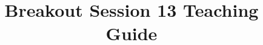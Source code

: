 \documentclass[nooutcomes]{ximera}
\title{Breakout Session 13 Teaching Guide}
\begin{document}
\begin{abstract}


\end{abstract}
\maketitle


\end{document}
